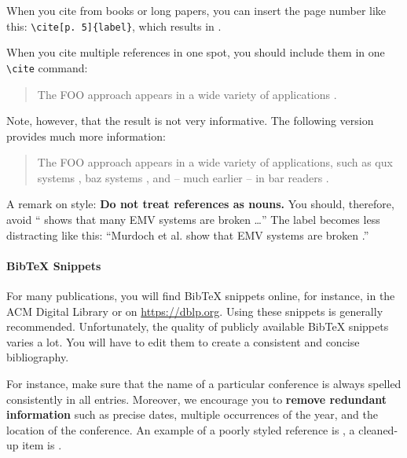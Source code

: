 When you cite from books or long papers, you can insert the page number like this: \verb|\cite[p. 5]{label}|, which results in \cite[p. 5]{kou_weidong_secure_2003}.

When you cite multiple references in one spot, you should include them in one \verb|\cite| command:
\begin{quote}
  The FOO approach appears in a wide variety of applications \cite{murdoch_steven_j._chip_2010,anderson_ross_emv:_2014,kou_weidong_secure_2003}.
\end{quote}

Note, however, that the result is not very informative.%
The following version provides much more information:
\begin{quote}
The FOO approach appears in a wide variety of applications, such as qux systems \cite{murdoch_steven_j._chip_2010}, baz systems \cite{anderson_ross_emv:_2014}, and -- much earlier -- in bar readers \cite{kou_weidong_secure_2003}.
\end{quote}

A remark on style: \textbf{Do not treat references as nouns.} You should, therefore, avoid ``\cite{murdoch_steven_j._chip_2010} shows that many EMV systems are broken \ldots'' The label becomes less distracting like this: ``Murdoch et al. show that EMV systems are broken  \cite{murdoch_steven_j._chip_2010}.''

\paragraph{BibTeX Snippets}

For many publications, you will find BibTeX snippets online, for instance, in the ACM Digital Library or on \url{https://dblp.org}. Using these snippets is generally recommended. Unfortunately, the quality of publicly available BibTeX snippets varies a lot. You will have to edit them to create a consistent and concise bibliography.

For instance,
 make sure that the name of a particular conference is always spelled consistently in all entries. Moreover, we encourage you to \textbf{remove redundant information} such as precise dates, multiple occurrences of the year, and the location of the conference.%
An example of a poorly styled reference is \cite{BuchananRSS08}, a cleaned-up item is \cite{DietrichKBF18}.

